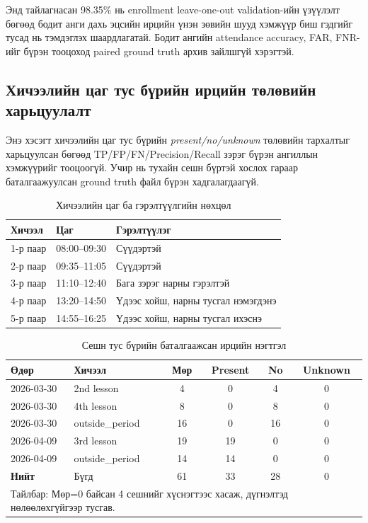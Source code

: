 Энд тайлагнасан 98.35\% нь enrollment leave-one-out validation-ийн үзүүлэлт бөгөөд бодит анги дахь эцсийн ирцийн үнэн зөвийн шууд хэмжүүр биш гэдгийг тусад нь тэмдэглэх шаардлагатай. Бодит ангийн attendance accuracy, FAR, FNR-ийг бүрэн тооцоход paired ground truth архив зайлшгүй хэрэгтэй.

\subsection{Хичээлийн цаг тус бүрийн ирцийн төлөвийн харьцуулалт}

Энэ хэсэгт хичээлийн цаг тус бүрийн \textit{present/no/unknown} төлөвийн тархалтыг харьцуулсан бөгөөд TP/FP/FN/Precision/Recall зэрэг бүрэн ангиллын хэмжүүрийг тооцоогүй. Учир нь тухайн сешн бүртэй хослох гараар баталгаажуулсан ground truth файл бүрэн хадгалагдаагүй.

\begin{table}[H]
	\centering
	\caption{Хичээлийн цаг ба гэрэлтүүлгийн нөхцөл}
	\label{tab:lesson-metrics-lighting}
	\begin{tabular}{|l|l|l|}
		\hline
		\textbf{Хичээл} & \textbf{Цаг} & \textbf{Гэрэлтүүлэг} \\
		\hline
		1-р паар & 08:00--09:30 & Сүүдэртэй \\
		\hline
		2-р паар & 09:35--11:05 & Сүүдэртэй \\
		\hline
		3-р паар & 11:10--12:40 & Бага зэрэг нарны гэрэлтэй \\
		\hline
		4-р паар & 13:20--14:50 & Үдээс хойш, нарны тусгал нэмэгдэнэ \\
		\hline
		5-р паар & 14:55--16:25 & Үдээс хойш, нарны тусгал ихэснэ \\
		\hline
	\end{tabular}
\end{table}

\begin{table}[H]
	\centering
	\caption{Сешн тус бүрийн баталгаажсан ирцийн нэгтгэл}
	\label{tab:lesson-metrics-by-period}
	\begin{tabular}{|l|l|c|c|c|c|}
		\hline
		\textbf{Өдөр} & \textbf{Хичээл} & \textbf{Мөр} & \textbf{Present} & \textbf{No} & \textbf{Unknown} \\
		\hline
		2026-03-30 & 2nd lesson & 4 & 0 & 4 & 0 \\
		\hline
		2026-03-30 & 4th lesson & 8 & 0 & 8 & 0 \\
		\hline
		2026-03-30 & outside\_period & 16 & 0 & 16 & 0 \\
		\hline
		2026-04-09 & 3rd lesson & 19 & 19 & 0 & 0 \\
		\hline
		2026-04-09 & outside\_period & 14 & 14 & 0 & 0 \\
		\hline
		\textbf{Нийт} & Бүгд & 61 & 33 & 28 & 0 \\
		\hline
		\multicolumn{6}{|l|}{\footnotesize Тайлбар: Мөр=0 байсан 4 сешнийг хүснэгтээс хасаж, дүгнэлтэд нөлөөлөхгүйгээр тусгав.} \\
		\hline
	\end{tabular}
\end{table}

